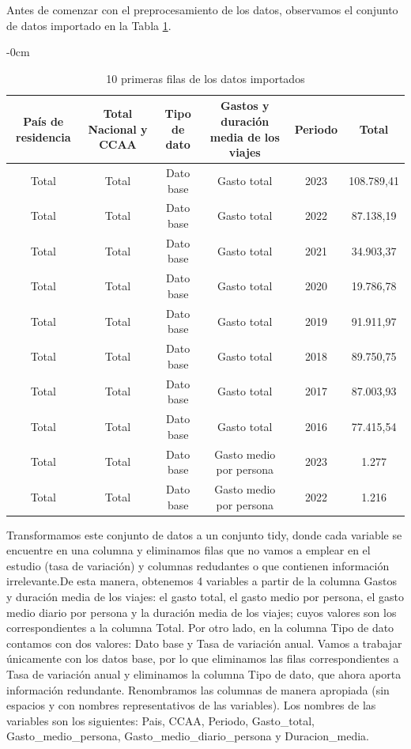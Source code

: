 \documentclass[data,article,submit,moreauthors,pdftex]{Definitions/mdpi}
\begin{document}
Antes de comenzar con el preprocesamiento de los datos, observamos el
conjunto de datos importado en la Tabla \ref{tab:unnamed-chunk-4}.

\begin{table}[H]

\caption{\label{tab:unnamed-chunk-4}10 primeras filas de los datos importados}
\begin{adjustwidth}{-\extralength}{0cm}
             \small
\begin{tabular}[t]{cccccc}
\toprule
País de residencia & Total Nacional y CCAA & Tipo de dato & Gastos y duración media de los viajes & Periodo & Total\\
\midrule
Total & Total & Dato base & Gasto total & 2023 & 108.789,41\\
Total & Total & Dato base & Gasto total & 2022 & 87.138,19\\
Total & Total & Dato base & Gasto total & 2021 & 34.903,37\\
Total & Total & Dato base & Gasto total & 2020 & 19.786,78\\
Total & Total & Dato base & Gasto total & 2019 & 91.911,97\\
Total & Total & Dato base & Gasto total & 2018 & 89.750,75\\
Total & Total & Dato base & Gasto total & 2017 & 87.003,93\\
Total & Total & Dato base & Gasto total & 2016 & 77.415,54\\
Total & Total & Dato base & Gasto medio por persona & 2023 & 1.277\\
Total & Total & Dato base & Gasto medio por persona & 2022 & 1.216\\
\bottomrule
\end{tabular}
    \end{adjustwidth}
\end{table}

Transformamos este conjunto de datos a un conjunto tidy, donde cada
variable se encuentre en una columna y eliminamos filas que no vamos a
emplear en el estudio (tasa de variación) y columnas redudantes o que
contienen información irrelevante.De esta manera, obtenemos 4 variables
a partir de la columna Gastos y duración media de los viajes: el gasto
total, el gasto medio por persona, el gasto medio diario por persona y
la duración media de los viajes; cuyos valores son los correspondientes
a la columna Total. Por otro lado, en la columna Tipo de dato contamos
con dos valores: Dato base y Tasa de variación anual. Vamos a trabajar
únicamente con los datos base, por lo que eliminamos las filas
correspondientes a Tasa de variación anual y eliminamos la columna Tipo
de dato, que ahora aporta información redundante. Renombramos las
columnas de manera apropiada (sin espacios y con nombres representativos
de las variables). Los nombres de las variables son los siguientes:
Pais, CCAA, Periodo, Gasto\_total, Gasto\_medio\_persona,
Gasto\_medio\_diario\_persona y Duracion\_media.
\end{document}
